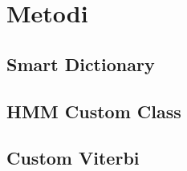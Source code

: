\section{Metodi}

\subsection{Smart Dictionary}

\subsection{HMM Custom Class}

\subsection{Custom Viterbi}
